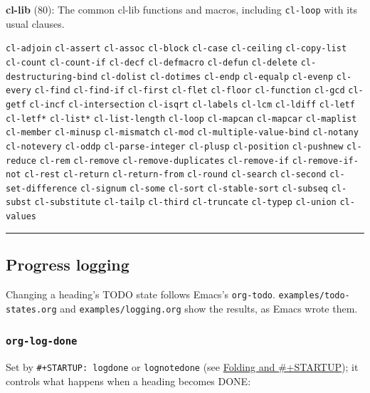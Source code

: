 \documentclass[11pt]{article}
\begin{document}
\textbf{cl-lib} (80): The common cl-lib functions and macros, including \texttt{cl-loop} with its usual clauses.

\texttt{cl-adjoin} \texttt{cl-assert} \texttt{cl-assoc} \texttt{cl-block} \texttt{cl-case} \texttt{cl-ceiling} \texttt{cl-copy-list} \texttt{cl-count} \texttt{cl-count-if} \texttt{cl-decf} \texttt{cl-defmacro} \texttt{cl-defun} \texttt{cl-delete} \texttt{cl-destructuring-bind} \texttt{cl-dolist} \texttt{cl-dotimes} \texttt{cl-endp} \texttt{cl-equalp} \texttt{cl-evenp} \texttt{cl-every} \texttt{cl-find} \texttt{cl-find-if} \texttt{cl-first} \texttt{cl-flet} \texttt{cl-floor} \texttt{cl-function} \texttt{cl-gcd} \texttt{cl-getf} \texttt{cl-incf} \texttt{cl-intersection} \texttt{cl-isqrt} \texttt{cl-labels} \texttt{cl-lcm} \texttt{cl-ldiff} \texttt{cl-letf} \texttt{cl-letf*} \texttt{cl-list*} \texttt{cl-list-length} \texttt{cl-loop} \texttt{cl-mapcan} \texttt{cl-mapcar} \texttt{cl-maplist} \texttt{cl-member} \texttt{cl-minusp} \texttt{cl-mismatch} \texttt{cl-mod} \texttt{cl-multiple-value-bind} \texttt{cl-notany} \texttt{cl-notevery} \texttt{cl-oddp} \texttt{cl-parse-integer} \texttt{cl-plusp} \texttt{cl-position} \texttt{cl-pushnew} \texttt{cl-reduce} \texttt{cl-rem} \texttt{cl-remove} \texttt{cl-remove-duplicates} \texttt{cl-remove-if} \texttt{cl-remove-if-not} \texttt{cl-rest} \texttt{cl-return} \texttt{cl-return-from} \texttt{cl-round} \texttt{cl-search} \texttt{cl-second} \texttt{cl-set-difference} \texttt{cl-signum} \texttt{cl-some} \texttt{cl-sort} \texttt{cl-stable-sort} \texttt{cl-subseq} \texttt{cl-subst} \texttt{cl-substitute} \texttt{cl-tailp} \texttt{cl-third} \texttt{cl-truncate} \texttt{cl-typep} \texttt{cl-union} \texttt{cl-values}

\noindent\rule{\textwidth}{0.5pt}

\subsection{Progress logging}
\label{sec:orgfbb8a58}
Changing a heading's TODO state follows Emacs's \texttt{org-todo}. \texttt{examples/todo-states.org} and \texttt{examples/logging.org} show the results, as Emacs wrote them.

\subsubsection{\texttt{org-log-done}}
\label{sec:orgeee8459}

Set by \texttt{\#+STARTUP: logdone} or \texttt{lognotedone} (see \hyperref[sec:org4faaf88]{Folding and \#+STARTUP}); it controls what happens when a heading becomes DONE:
\end{document}

